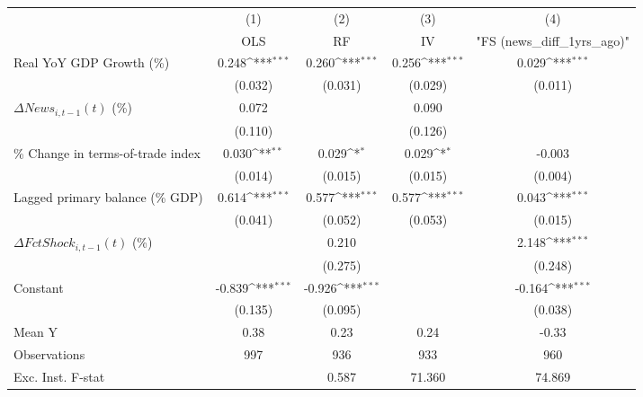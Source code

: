 {
\def\sym#1{\ifmmode^{#1}\else\(^{#1}\)\fi}
\begin{tabular}{l*{4}{c}}
\toprule
                    &\multicolumn{1}{c}{(1)}&\multicolumn{1}{c}{(2)}&\multicolumn{1}{c}{(3)}&\multicolumn{1}{c}{(4)}\\
                    &\multicolumn{1}{c}{OLS}&\multicolumn{1}{c}{RF}&\multicolumn{1}{c}{IV}&\multicolumn{1}{c}{ "FS (news_diff_1yrs_ago)" }\\
\midrule
Real YoY GDP Growth (\%)&       0.248\sym{***}&       0.260\sym{***}&       0.256\sym{***}&       0.029\sym{***}\\
                    &     (0.032)         &     (0.031)         &     (0.029)         &     (0.011)         \\
\addlinespace
$ \Delta News_{i,t-1}(t)$ (\%)&       0.072         &                     &       0.090         &                     \\
                    &     (0.110)         &                     &     (0.126)         &                     \\
\addlinespace
\% Change in terms-of-trade index&       0.030\sym{**} &       0.029\sym{*}  &       0.029\sym{*}  &      -0.003         \\
                    &     (0.014)         &     (0.015)         &     (0.015)         &     (0.004)         \\
\addlinespace
Lagged primary balance (\% GDP)&       0.614\sym{***}&       0.577\sym{***}&       0.577\sym{***}&       0.043\sym{***}\\
                    &     (0.041)         &     (0.052)         &     (0.053)         &     (0.015)         \\
\addlinespace
$ \Delta FctShock_{i,t-1}(t)$ (\%)&                     &       0.210         &                     &       2.148\sym{***}\\
                    &                     &     (0.275)         &                     &     (0.248)         \\
\addlinespace
Constant            &      -0.839\sym{***}&      -0.926\sym{***}&                     &      -0.164\sym{***}\\
                    &     (0.135)         &     (0.095)         &                     &     (0.038)         \\
\midrule
Mean Y              &        0.38         &        0.23         &        0.24         &       -0.33         \\
Observations        &         997         &         936         &         933         &         960         \\
Exc. Inst. F-stat   &                     &       0.587         &      71.360         &      74.869         \\
\bottomrule
\end{tabular}
}
